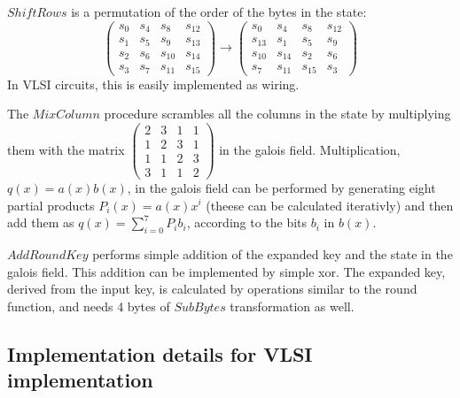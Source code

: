 $ShiftRows$ is a permutation of the order of the bytes in the state:
\begin{equation}
  \begin{pmatrix}
    s_0 & s_4 & s_8    & s_{12} \\
    s_1 & s_5 & s_9    & s_{13} \\
    s_2 & s_6 & s_{10} & s_{14} \\
    s_3 & s_7 & s_{11} & s_{15}
  \end{pmatrix} 
  \rightarrow
  \begin{pmatrix}
    s_0    & s_4    & s_8    & s_{12} \\
    s_{13} & s_1    & s_5    & s_9 \\
    s_{10} & s_{14} & s_2    & s_6 \\
    s_7    & s_{11} & s_{15} & s_3    
    \end{pmatrix}
\end{equation}
In VLSI circuits, this is easily implemented as wiring.

The $MixColumn$ procedure scrambles all the columns in the state
by multiplying them with the matrix $
\begin{pmatrix}
  2 & 3 & 1 & 1 \\
  1 & 2 & 3 & 1 \\
  1 & 1 & 2 & 3 \\
  3 & 1 & 1 & 2
\end{pmatrix}$ 
in the galois field. Multiplication, $q(x)=a(x)b(x)$, in the galois
field can be performed by generating eight partial products $P_i(x) =
a(x) x^i$ (theese can be calculated iterativly) and then add them as
$q(x) = \sum_{i=0}^{7} P_i b_i$, according to the bits $b_i$ in
$b(x)$.

$AddRoundKey$ performs simple addition of the expanded key and the
state in the galois field. This addition can be implemented by simple
xor. The expanded key, derived from the input key, is calculated by
operations similar to the round function, and needs 4 bytes of
$SubBytes$ transformation as well.


\subsection{Implementation details for VLSI implementation}

